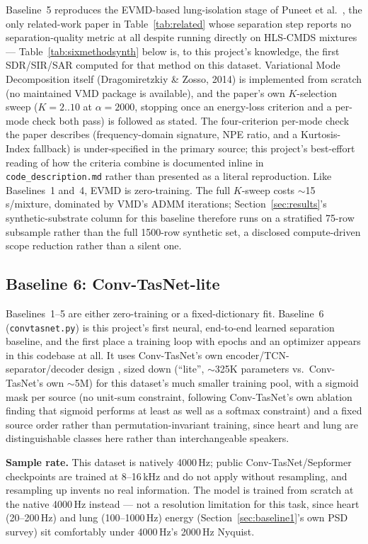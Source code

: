 \documentclass[11pt]{article}
\begin{document}
Baseline~5 reproduces the EVMD-based lung-isolation stage of Puneet et al.\
\cite{edgelung}, the only related-work paper in Table~\ref{tab:related}
whose separation step reports no separation-quality metric at all despite
running directly on HLS-CMDS mixtures --- Table~\ref{tab:sixmethodsynth}
below is, to this project's knowledge, the first SDR/SIR/SAR computed for
that method on this dataset. Variational Mode Decomposition itself (Dragomiretzkiy
\& Zosso, 2014) is implemented from scratch (no maintained VMD package is
available), and the paper's own $K$-selection sweep ($K{=}2..10$ at
$\alpha{=}2000$, stopping once an energy-loss criterion and a per-mode
check both pass) is followed as stated. The four-criterion per-mode check
the paper describes (frequency-domain signature, NPE ratio, and a
Kurtosis-Index fallback) is under-specified in the primary source; this
project's best-effort reading of how the criteria combine is documented
inline in \texttt{code\_description.md} rather than presented as a literal
reproduction. Like Baselines~1 and~4, EVMD is zero-training. The full
$K$-sweep costs $\sim$15\,s/mixture, dominated by VMD's ADMM iterations;
Section~\ref{sec:results}'s synthetic-substrate column for this baseline
therefore runs on a stratified 75-row subsample rather than the full
1500-row synthetic set, a disclosed compute-driven scope reduction rather
than a silent one.

\subsection{Baseline 6: Conv-TasNet-lite}
\label{sec:baseline6}

Baselines~1--5 are either zero-training or a fixed-dictionary fit.
Baseline~6 (\texttt{convtasnet.py}) is this project's first neural,
end-to-end learned separation baseline, and the first place a training
loop with epochs and an optimizer appears in this codebase at all. It uses
Conv-TasNet's own encoder/TCN-separator/decoder design
\cite{luomesgarani2019}, sized down (``lite'', $\sim$325K parameters vs.\
Conv-TasNet's own $\sim$5M) for this dataset's much smaller training pool,
with a sigmoid mask per source (no unit-sum constraint, following
Conv-TasNet's own ablation finding that sigmoid performs at least as well as
a softmax constraint) and a fixed source order rather than
permutation-invariant training, since heart and lung are distinguishable
classes here rather than interchangeable speakers.

\textbf{Sample rate.} This dataset is natively 4000\,Hz; public
Conv-TasNet/Sepformer checkpoints are trained at 8--16\,kHz and do not
apply without resampling, and resampling up invents no real information.
The model is trained from scratch at the native 4000\,Hz instead --- not a
resolution limitation for this task, since heart (20--200\,Hz) and lung
(100--1000\,Hz) energy (Section~\ref{sec:baseline1}'s own PSD survey) sit
comfortably under 4000\,Hz's 2000\,Hz Nyquist.
\end{document}
